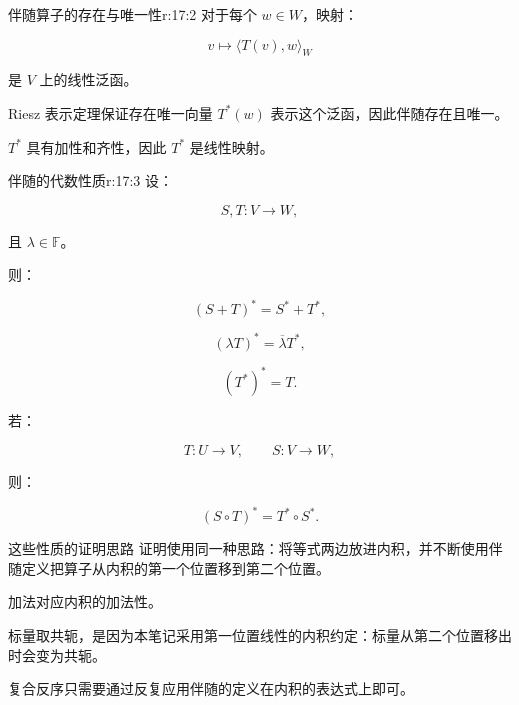 \begin{jprop}{伴随算子的存在与唯一性}{r:17:2}
对于每个 $w\in W$，映射：

\[
v\mapsto\langle T(v),w\rangle_W
\]

是 $V$ 上的线性泛函。

Riesz 表示定理保证存在唯一向量 $T^*(w)$ 表示这个泛函，因此伴随存在且唯一。

$T^*$ 具有加性和齐性，因此 $T^*$ 是线性映射。
\end{jprop}

\begin{jprop}{伴随的代数性质}{r:17:3}
设：

\[
S,T:V\to W,
\]

且 $\lambda\in\mathbb F$。

则：

\[
(S+T)^*=S^*+T^*,
\]

\[
(\lambda T)^*=\overline{\lambda}T^*,
\]

\[
(T^*)^*=T.
\]

若：

\[
T:U\to V,
\qquad
S:V\to W,
\]

则：

\[
(S\circ T)^*=T^*\circ S^*.
\]
\end{jprop}

\begin{jproof}{这些性质的证明思路}
证明使用同一种思路：将等式两边放进内积，并不断使用伴随定义把算子从内积的第一个位置移到第二个位置。

加法对应内积的加法性。

标量取共轭，是因为本笔记采用第一位置线性的内积约定：标量从第二个位置移出时会变为共轭。

复合反序只需要通过反复应用伴随的定义在内积的表达式上即可。
\end{jproof}
